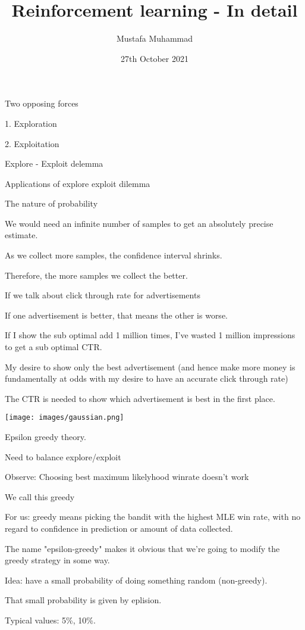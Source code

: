 \documentclass[30pt, a4]{article}
\title{Reinforcement learning - In detail}
\author{Mustafa Muhammad}
\date{27th October 2021}
\begin{document}
\maketitle
Two opposing forces

1. Exploration

2. Exploitation

Explore - Exploit delemma

Applications of explore exploit dilemma

The nature of probability

We would need an infinite number of samples to get an absolutely precise
estimate.

As we collect more samples, the confidence interval shrinks.

Therefore, the more samples we collect the better.

If we talk about click through rate for advertisements

If one advertisement is better, that means the other is worse.

If I show the sub optimal add 1 million times, I've wasted 1 million impressions
to get a sub optimal CTR.

My desire to show only the best advertisement (and hence make more money is
fundamentally at odds with my desire to have an accurate click through rate)

The CTR is needed to show which advertisement is best in the first place.

\begin{figure*}[htp] 
    \centering 
    \texttt{[image: images/gaussian.png]} 
 \end{figure*} 

Epsilon greedy theory.

Need to balance explore/exploit

Observe: Choosing best maximum likelyhood winrate doesn't work

We call this greedy

For us: greedy means picking the bandit with the highest MLE win rate, with no
regard to confidence in prediction or amount of data collected.

The name "epsilon-greedy" makes it obvious that we're going to modify the greedy
strategy in some way.

Idea: have a small probability of doing something random (non-greedy).

That small probability is given by eplision.

Typical values: 5\%, 10\%.
\end{document}

